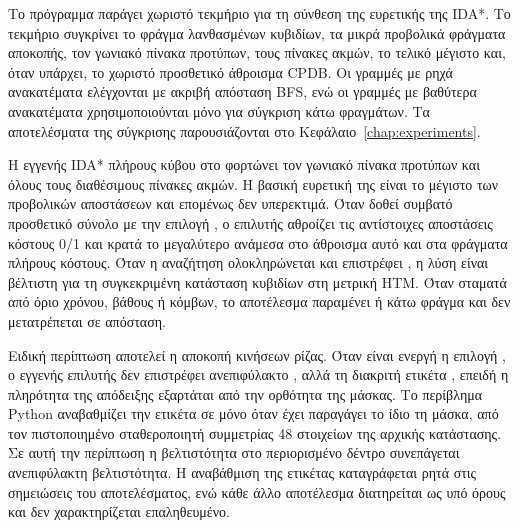 \begin{table}[htbp]\centering

\caption{Μεταδεδομένα των οκτώ εξακμικών πινάκων προτύπων του 3×3×3 ανά υποσύνολο ακμών: πλήθος καταστάσεων, πληρότητα, μέγιστη απόσταση, μέγεθος και χρόνος παραγωγής, από τα τεκμήρια .}
\label{tab:edge-pdb-metadata}
\end{table}

\begin{table}[htbp]\centering

\caption{Σύγκριση κάλυψης του παραδεκτού φράγματος ακμών μεταξύ του αρχικού συνόλου τεσσάρων και του εκτεταμένου συνόλου οκτώ εξακμικών προβολών, σε ντετερμινιστικό δείγμα ανά βάθος ανακατέματος (), από το τεκμήριο .}
\label{tab:edge-pdb-coverage}
\end{table}

Το πρόγραμμα  παράγει χωριστό τεκμήριο για τη σύνθεση της ευρετικής της IDA*. Το τεκμήριο συγκρίνει το φράγμα λανθασμένων κυβιδίων, τα μικρά προβολικά φράγματα αποκοπής, τον γωνιακό πίνακα προτύπων, τους πίνακες ακμών, το τελικό μέγιστο και, όταν υπάρχει, το χωριστό προσθετικό άθροισμα CPDB. Οι γραμμές με ρηχά ανακατέματα ελέγχονται με ακριβή απόσταση BFS, ενώ οι γραμμές με βαθύτερα ανακατέματα χρησιμοποιούνται μόνο για σύγκριση κάτω φραγμάτων. Τα αποτελέσματα της σύγκρισης παρουσιάζονται στο Κεφάλαιο~\ref{chap:experiments}.

Η εγγενής IDA* πλήρους κύβου στο  φορτώνει τον γωνιακό πίνακα προτύπων και όλους τους διαθέσιμους πίνακες ακμών. Η βασική ευρετική της είναι το μέγιστο των προβολικών αποστάσεων και επομένως δεν υπερεκτιμά. Όταν δοθεί συμβατό προσθετικό σύνολο με την επιλογή , ο επιλυτής αθροίζει τις αντίστοιχες αποστάσεις κόστους 0/1 και κρατά το μεγαλύτερο ανάμεσα στο άθροισμα αυτό και στα φράγματα πλήρους κόστους. Όταν η αναζήτηση ολοκληρώνεται και επιστρέφει , η λύση είναι βέλτιστη για τη συγκεκριμένη κατάσταση κυβιδίων στη μετρική HTM. Όταν σταματά από όριο χρόνου, βάθους ή κόμβων, το αποτέλεσμα παραμένει  ή κάτω φράγμα και δεν μετατρέπεται σε απόσταση.

Ειδική περίπτωση αποτελεί η αποκοπή κινήσεων ρίζας. Όταν είναι ενεργή η επιλογή , ο εγγενής επιλυτής δεν επιστρέφει ανεπιφύλακτο , αλλά τη διακριτή ετικέτα , επειδή η πληρότητα της απόδειξης εξαρτάται από την ορθότητα της μάσκας. Το περίβλημα Python αναβαθμίζει την ετικέτα σε  μόνο όταν έχει παραγάγει το ίδιο τη μάσκα, από τον πιστοποιημένο σταθεροποιητή συμμετρίας 48 στοιχείων της αρχικής κατάστασης. Σε αυτή την περίπτωση η βελτιστότητα στο περιορισμένο δέντρο συνεπάγεται ανεπιφύλακτη βελτιστότητα. Η αναβάθμιση της ετικέτας καταγράφεται ρητά στις σημειώσεις του αποτελέσματος, ενώ κάθε άλλο αποτέλεσμα  διατηρείται ως υπό όρους και δεν χαρακτηρίζεται επαληθευμένο.

